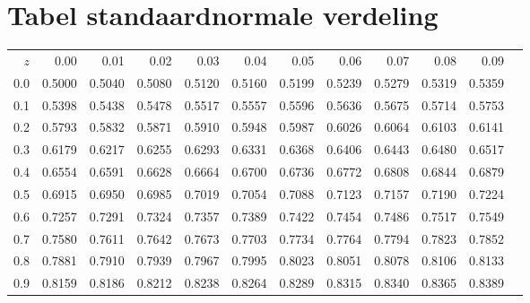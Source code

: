 \documentclass[a4paper,12pt, twoside]{article}
\begin{document}
\cleardoublepage
\appendix
\section{Tabel standaardnormale verdeling}

\begin{center}

\renewcommand{\arraystretch}{0.8}
\small
\begin{tabular}{rr@{\ }r@{\ }r@{\ }r@{\ }r@{\ }r@{\ }r@{\ }r@{\ }r@{\ }r@{\ }r}
  $z$&0.00&0.01&0.02&0.03&0.04&0.05&0.06&0.07&0.08&0.09\\[0.2cm]

0.0&0.5000&0.5040&0.5080&0.5120&0.5160&0.5199&0.5239&0.5279&0.5319&0.5359\\
0.1&0.5398&0.5438&0.5478&0.5517&0.5557&0.5596&0.5636&0.5675&0.5714&0.5753\\
0.2&0.5793&0.5832&0.5871&0.5910&0.5948&0.5987&0.6026&0.6064&0.6103&0.6141\\
0.3&0.6179&0.6217&0.6255&0.6293&0.6331&0.6368&0.6406&0.6443&0.6480&0.6517\\
0.4&0.6554&0.6591&0.6628&0.6664&0.6700&0.6736&0.6772&0.6808&0.6844&0.6879\\
0.5&0.6915&0.6950&0.6985&0.7019&0.7054&0.7088&0.7123&0.7157&0.7190&0.7224\\
0.6&0.7257&0.7291&0.7324&0.7357&0.7389&0.7422&0.7454&0.7486&0.7517&0.7549\\
0.7&0.7580&0.7611&0.7642&0.7673&0.7703&0.7734&0.7764&0.7794&0.7823&0.7852\\
0.8&0.7881&0.7910&0.7939&0.7967&0.7995&0.8023&0.8051&0.8078&0.8106&0.8133\\
0.9&0.8159&0.8186&0.8212&0.8238&0.8264&0.8289&0.8315&0.8340&0.8365&0.8389\\[0.2cm]


\end{tabular}
\end{center}
\end{document}
